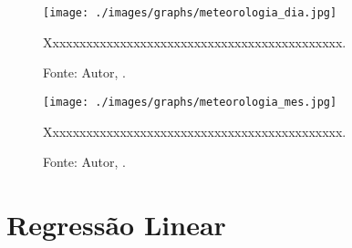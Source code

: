 
\lipsum[100]




\begin{figure}[H]
    \centering
    \texttt{[image: ./images/graphs/meteorologia\_dia.jpg]}
    \caption{Xxxxxxxxxxxxxxxxxxxxxxxxxxxxxxxxxxxxxxxxxxxx.}
    \label{fig:meteorologia_dia.jpg}
    \caption*{Fonte: Autor, \imprimirdata.}
\end{figure}




\lipsum[100]




\begin{figure}[H]
    \centering
    \texttt{[image: ./images/graphs/meteorologia\_mes.jpg]}
    \caption{Xxxxxxxxxxxxxxxxxxxxxxxxxxxxxxxxxxxxxxxxxxxx.}
    \label{fig:meteorologia_mes.jpg}
    \caption*{Fonte: Autor, \imprimirdata.}
\end{figure}




\lipsum[100]



\chapter{Regressão Linear}



